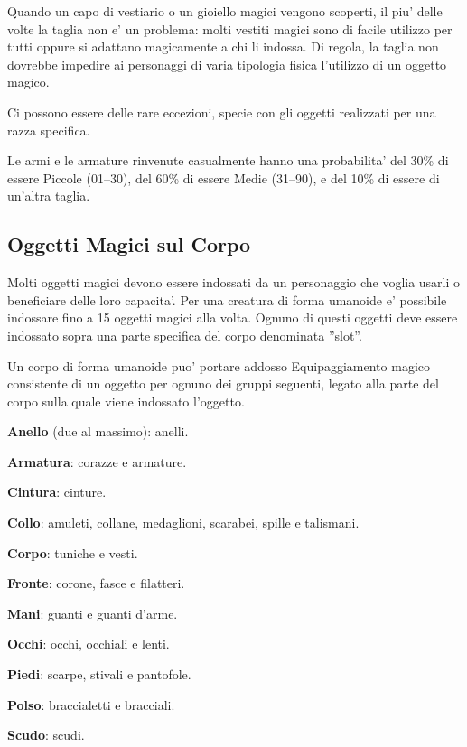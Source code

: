 \documentclass[a4paper,11pt,twoside,openany]{book}
\begin{document}
{\label{taglia-e-oggetti-magici}

Quando un capo di vestiario o un gioiello magici vengono scoperti, il piu' delle volte la taglia non e' un problema: molti vestiti magici sono di facile utilizzo per tutti oppure si adattano magicamente a chi li indossa. Di regola, la taglia non dovrebbe impedire ai personaggi di varia tipologia fisica l'utilizzo di un oggetto magico. 

Ci possono essere delle rare eccezioni, specie con gli oggetti realizzati per una razza specifica.

Le armi e le armature rinvenute casualmente hanno una probabilita' del 30\% di essere Piccole (01--30), del 60\% di essere Medie (31--90), e del 10\% di essere di un'altra taglia.

\subsection{Oggetti Magici sul Corpo}

\label{oggetti-magici-sul-corpo}

Molti oggetti magici devono essere indossati da un personaggio che voglia usarli o beneficiare delle loro capacita'. Per una creatura di forma umanoide e' possibile indossare fino a 15 oggetti magici alla volta. Ognuno di questi oggetti deve essere indossato sopra una parte specifica del corpo denominata ''slot''.

Un corpo di forma umanoide puo' portare addosso Equipaggiamento magico consistente di un oggetto per ognuno dei gruppi seguenti, legato alla parte del corpo sulla quale viene indossato l'oggetto.

\textbf{Anello} (due al massimo): anelli.

\textbf{Armatura}: corazze e armature.

\textbf{Cintura}: cinture.

\textbf{Collo}: amuleti, collane, medaglioni, scarabei, spille e talismani.

\textbf{Corpo}: tuniche e vesti.

\textbf{Fronte}: corone, fasce e filatteri.

\textbf{Mani}: guanti e guanti d'arme.

\textbf{Occhi}: occhi, occhiali e lenti.

\textbf{Piedi}: scarpe, stivali e pantofole.

\textbf{Polso}: braccialetti e bracciali.

\textbf{Scudo}: scudi.

}
\end{document}
